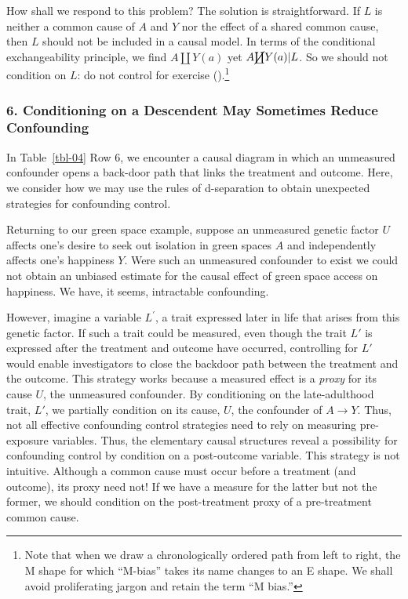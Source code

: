 \documentclass[
  singlecolumn]{article}
\begin{document}
How shall we respond to this problem? The solution is straightforward.
If \(L\) is neither a common cause of \(A\) and \(Y\) nor the effect of
a shared common cause, then \(L\) should not be included in a causal
model. In terms of the conditional exchangeability principle, we find
\(A \coprod Y(a)\) yet \(A \cancel{\coprod} Y(a)| L\). So we should not
condition on \(L\): do not control for exercise
().\footnote{Note that
  when we draw a chronologically ordered path from left to right, the M
  shape for which ``M-bias'' takes its name changes to an E shape. We
  shall avoid proliferating jargon and retain the term ``M bias.''}

\subsubsection{6. Conditioning on a Descendent May Sometimes Reduce
Confounding}\label{conditioning-on-a-descendent-may-sometimes-reduce-confounding}

In Table~\ref{tbl-04} Row 6, we encounter a causal diagram in which an
unmeasured confounder opens a back-door path that links the treatment
and outcome. Here, we consider how we may use the rules of d-separation
to obtain unexpected strategies for confounding control.

Returning to our green space example, suppose an unmeasured genetic
factor \(U\) affects one's desire to seek out isolation in green spaces
\(A\) and independently affects one's happiness \(Y\). Were such an
unmeasured confounder to exist we could not obtain an unbiased estimate
for the causal effect of green space access on happiness. We have, it
seems, intractable confounding.

However, imagine a variable \(L^\prime\), a trait expressed later in
life that arises from this genetic factor. If such a trait could be
measured, even though the trait \(L'\) is expressed after the treatment
and outcome have occurred, controlling for \(L'\) would enable
investigators to close the backdoor path between the treatment and the
outcome. This strategy works because a measured effect is a \emph{proxy}
for its cause \(U\), the unmeasured confounder. By conditioning on the
late-adulthood trait, \(L'\), we partially condition on its cause,
\(U\), the confounder of \(A \to Y\). Thus, not all effective
confounding control strategies need to rely on measuring pre-exposure
variables. Thus, the elementary causal structures reveal a possibility
for confounding control by condition on a post-outcome variable. This
strategy is not intuitive. Although a common cause must occur before a
treatment (and outcome), its proxy need not! If we have a measure for
the latter but not the former, we should condition on the post-treatment
proxy of a pre-treatment common cause.
\end{document}
